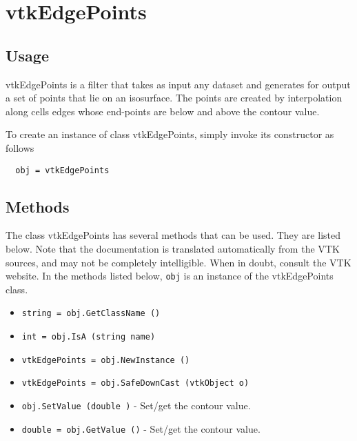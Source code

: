 \section{vtkEdgePoints}

\subsection{Usage}

 vtkEdgePoints is a filter that takes as input any dataset and 
 generates for output a set of points that lie on an isosurface. The 
 points are created by interpolation along cells edges whose end-points are 
 below and above the contour value.

To create an instance of class vtkEdgePoints, simply
invoke its constructor as follows
\begin{verbatim}
  obj = vtkEdgePoints
\end{verbatim}
\subsection{Methods}

The class vtkEdgePoints has several methods that can be used.
  They are listed below.
Note that the documentation is translated automatically from the VTK sources,
and may not be completely intelligible.  When in doubt, consult the VTK website.
In the methods listed below, \verb|obj| is an instance of the vtkEdgePoints class.
\begin{itemize}
\item  \verb|string = obj.GetClassName ()|

\item  \verb|int = obj.IsA (string name)|

\item  \verb|vtkEdgePoints = obj.NewInstance ()|

\item  \verb|vtkEdgePoints = obj.SafeDownCast (vtkObject o)|

\item  \verb|obj.SetValue (double )| -  Set/get the contour value.

\item  \verb|double = obj.GetValue ()| -  Set/get the contour value.

\end{itemize}

